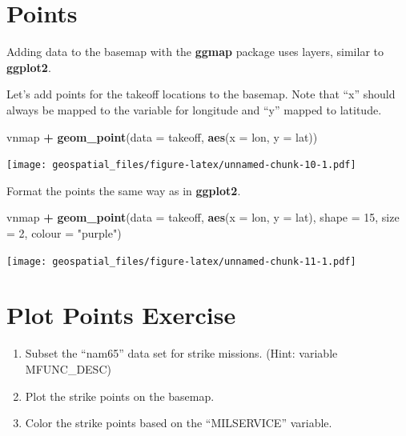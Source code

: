 \documentclass[oneside]{memoir}
\newenvironment{Shaded}{\begin{snugshade}}{\end{snugshade}}
\newcommand{\KeywordTok}[1]{\textcolor[rgb]{0.13,0.29,0.53}{\textbf{#1}}}
\newcommand{\DataTypeTok}[1]{\textcolor[rgb]{0.13,0.29,0.53}{#1}}
\newcommand{\DecValTok}[1]{\textcolor[rgb]{0.00,0.00,0.81}{#1}}
\newcommand{\StringTok}[1]{\textcolor[rgb]{0.31,0.60,0.02}{#1}}
\newcommand{\OperatorTok}[1]{\textcolor[rgb]{0.81,0.36,0.00}{\textbf{#1}}}
\newcommand{\NormalTok}[1]{#1}
\theoremstyle{definition}
\theoremstyle{definition}
\theoremstyle{definition}
\theoremstyle{remark}
\begin{document}
\section{Points}\label{points}

Adding data to the basemap with the \textbf{ggmap} package uses layers,
similar to \textbf{ggplot2}.

Let's add points for the takeoff locations to the basemap. Note that
``x'' should always be mapped to the variable for longitude and ``y''
mapped to latitude.

\begin{Shaded}
\begin{Highlighting}[]
\NormalTok{vnmap }\OperatorTok{+}\StringTok{ }
\StringTok{  }\KeywordTok{geom_point}\NormalTok{(}\DataTypeTok{data =}\NormalTok{ takeoff, }\KeywordTok{aes}\NormalTok{(}\DataTypeTok{x =}\NormalTok{ lon, }\DataTypeTok{y =}\NormalTok{ lat))}
\end{Highlighting}
\end{Shaded}

\texttt{[image: geospatial\_files/figure-latex/unnamed-chunk-10-1.pdf]}

Format the points the same way as in \textbf{ggplot2}.

\begin{Shaded}
\begin{Highlighting}[]
\NormalTok{vnmap }\OperatorTok{+}
\StringTok{  }\KeywordTok{geom_point}\NormalTok{(}\DataTypeTok{data =}\NormalTok{ takeoff, }\KeywordTok{aes}\NormalTok{(}\DataTypeTok{x =}\NormalTok{ lon, }\DataTypeTok{y =}\NormalTok{ lat), }\DataTypeTok{shape =} \DecValTok{15}\NormalTok{, }\DataTypeTok{size =} \DecValTok{2}\NormalTok{, }\DataTypeTok{colour =} \StringTok{"purple"}\NormalTok{) }
\end{Highlighting}
\end{Shaded}

\texttt{[image: geospatial\_files/figure-latex/unnamed-chunk-11-1.pdf]}

\section{Plot Points Exercise}\label{plot-points-exercise}

\begin{enumerate}
\def\labelenumi{\arabic{enumi}.}
\item
  Subset the ``nam65'' data set for strike missions. (Hint: variable
  MFUNC\_DESC)
\item
  Plot the strike points on the basemap.
\item
  Color the strike points based on the ``MILSERVICE'' variable.
\end{enumerate}
\end{document}
